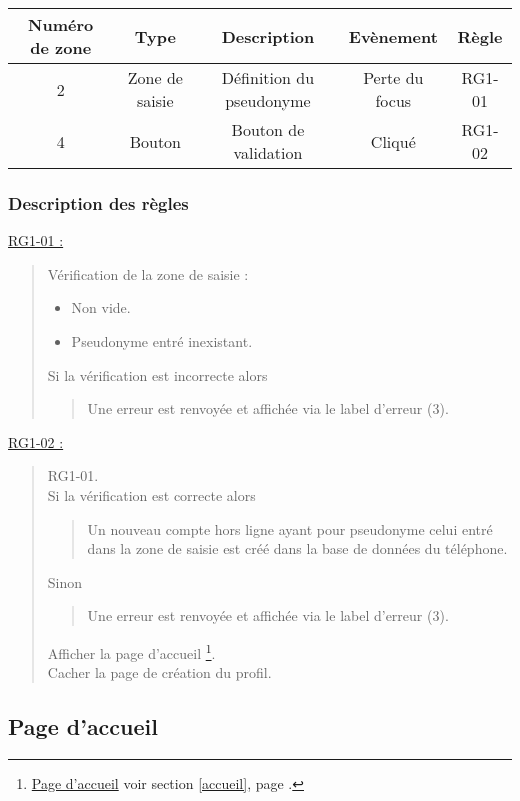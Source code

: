 \documentclass{report}
\begin{document}
			\begin{tabular}{|c|c|c|c|c|} \hline
				Numéro de zone & Type  & Description & Evènement &	Règle \\\hline 
				2 & Zone de saisie & Définition du pseudonyme & Perte du focus & RG1-01 \\\hline
				4 & Bouton         & Bouton de validation     & Cliqué & RG1-02 \\\hline
			\end{tabular}

		\subsubsection{Description des règles}
		
		\underline{RG1-01 :}
			\begin{quote}
				Vérification de la zone de saisie :
				\begin{itemize}
				  \item Non vide.
				  \item Pseudonyme entré inexistant.
				\end{itemize}
				Si la vérification est incorrecte alors
				\begin{quote}
					Une erreur est renvoyée et affichée via le label d'erreur (3).
				\end{quote}
			\end{quote}
			
		\underline{RG1-02 :}
			\begin{quote}
				RG1-01.\\
				Si la vérification est correcte alors
				\begin{quote}
					Un nouveau compte hors ligne ayant pour pseudonyme celui
					entré dans la zone de saisie est créé dans la base de
					données du téléphone.
				\end{quote}				
				Sinon
				\begin{quote}
					Une erreur est renvoyée et affichée via le label d'erreur (3).
				\end{quote}
				Afficher la page d'accueil%
					\footnote[1]{
						\hyperlink{Page d'accueil}{Page d'accueil}
						\og voir section \ref{accueil}, page \pageref{accueil}.\fg
					}.\\
				Cacher la page de création du profil.
			\end{quote}
	
\newpage

	\subsection{Page d'accueil}
		\hypertarget{Page d'accueil}{}
		\label{accueil}
\end{document}
